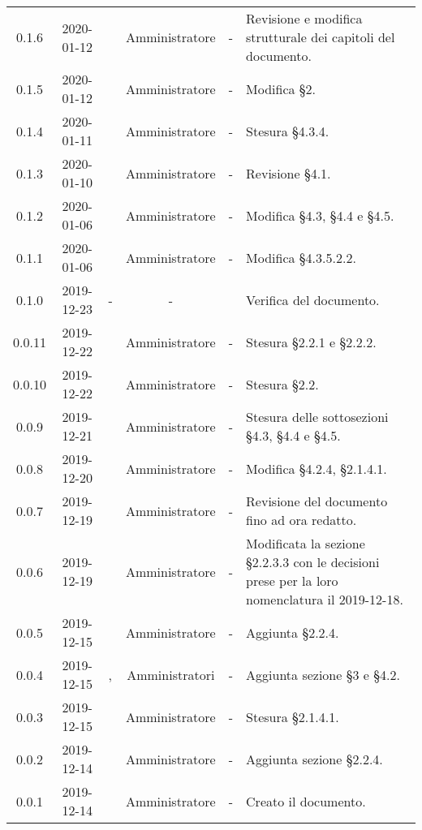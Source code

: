 {\begin{longtable}{ c c  C{2.3cm} c C{3cm} C{3.2cm}}
0.1.6 & 2020-01-12 & \MC{} & Amministratore & - & Revisione e modifica strutturale dei capitoli del documento. \\

0.1.5 & 2020-01-12 & \AT{} & Amministratore & - & Modifica §2. \\

0.1.4 & 2020-01-11 & \MC{} & Amministratore & - & Stesura §4.3.4. \\

0.1.3 & 2020-01-10 & \MC{} & Amministratore & - & Revisione §4.1. \\

0.1.2 & 2020-01-06 & \AT{} & Amministratore & - & Modifica §4.3, §4.4 e §4.5. \\

0.1.1 & 2020-01-06 & \AT{} & Amministratore & - & Modifica §4.3.5.2.2. \\

0.1.0 & 2019-12-23 & - & - & \CE{} & Verifica del documento. \\

0.0.11 & 2019-12-22 & \PF{} & Amministratore & - & Stesura §2.2.1 e §2.2.2. \\

0.0.10 & 2019-12-22 & \PF{} & Amministratore & - & Stesura §2.2. \\

0.0.9 & 2019-12-21 & \PF{} & Amministratore & - & Stesura delle sottosezioni §4.3, §4.4 e §4.5. \\

0.0.8 & 2019-12-20 & \MC{} & Amministratore & - & Modifica §4.2.4, §2.1.4.1. \\

0.0.7 & 2019-12-19 & \SE{} & Amministratore & - & Revisione del documento fino ad ora redatto. \\

0.0.6 & 2019-12-19 & \CE{} & Amministratore & - & Modificata la sezione §2.2.3.3 con le decisioni prese per la loro nomenclatura il 2019-12-18. \\

0.0.5 & 2019-12-15 & \SE{} & Amministratore & - & Aggiunta §2.2.4. \\

0.0.4 & 2019-12-15 & \BR{}, \PF{} & Amministratori & - & Aggiunta sezione §3 e §4.2. \\

0.0.3 & 2019-12-15 & \MC{} & Amministratore & - & Stesura §2.1.4.1. \\

0.0.2 & 2019-12-14 & \CE{} & Amministratore & - & Aggiunta sezione §2.2.4. \\

0.0.1 & 2019-12-14 & \CE{} & Amministratore & - & Creato il documento. \\
		
\end{longtable}
}